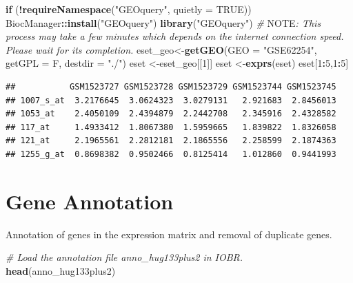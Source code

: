 \documentclass[
  12pt,
]{book}
\newenvironment{Shaded}{\begin{snugshade}}{\end{snugshade}}
\newcommand{\AlertTok}[1]{\textcolor[rgb]{0.94,0.16,0.16}{#1}}
\newcommand{\AttributeTok}[1]{\textcolor[rgb]{0.13,0.29,0.53}{#1}}
\newcommand{\CommentTok}[1]{\textcolor[rgb]{0.56,0.35,0.01}{\textit{#1}}}
\newcommand{\ConstantTok}[1]{\textcolor[rgb]{0.56,0.35,0.01}{#1}}
\newcommand{\ControlFlowTok}[1]{\textcolor[rgb]{0.13,0.29,0.53}{\textbf{#1}}}
\newcommand{\DecValTok}[1]{\textcolor[rgb]{0.00,0.00,0.81}{#1}}
\newcommand{\FunctionTok}[1]{\textcolor[rgb]{0.13,0.29,0.53}{\textbf{#1}}}
\newcommand{\NormalTok}[1]{#1}
\newcommand{\OtherTok}[1]{\textcolor[rgb]{0.56,0.35,0.01}{#1}}
\newcommand{\SpecialCharTok}[1]{\textcolor[rgb]{0.81,0.36,0.00}{\textbf{#1}}}
\newcommand{\StringTok}[1]{\textcolor[rgb]{0.31,0.60,0.02}{#1}}
\begin{document}
\begin{Shaded}
\begin{Highlighting}[]
\ControlFlowTok{if}\NormalTok{ (}\SpecialCharTok{!}\FunctionTok{requireNamespace}\NormalTok{(}\StringTok{"GEOquery"}\NormalTok{, }\AttributeTok{quietly =} \ConstantTok{TRUE}\NormalTok{))  BiocManager}\SpecialCharTok{::}\FunctionTok{install}\NormalTok{(}\StringTok{"GEOquery"}\NormalTok{)}
\FunctionTok{library}\NormalTok{(}\StringTok{"GEOquery"}\NormalTok{)}
\CommentTok{\# }\AlertTok{NOTE}\CommentTok{: This process may take a few minutes which depends on the internet connection speed. Please wait for its completion.}
\NormalTok{eset\_geo}\OtherTok{\textless{}{-}}\FunctionTok{getGEO}\NormalTok{(}\AttributeTok{GEO     =} \StringTok{"GSE62254"}\NormalTok{, }\AttributeTok{getGPL  =}\NormalTok{ F, }\AttributeTok{destdir =} \StringTok{"./"}\NormalTok{)}
\NormalTok{eset    }\OtherTok{\textless{}{-}}\NormalTok{eset\_geo[[}\DecValTok{1}\NormalTok{]]}
\NormalTok{eset    }\OtherTok{\textless{}{-}}\FunctionTok{exprs}\NormalTok{(eset)}
\NormalTok{eset[}\DecValTok{1}\SpecialCharTok{:}\DecValTok{5}\NormalTok{,}\DecValTok{1}\SpecialCharTok{:}\DecValTok{5}\NormalTok{]}
\end{Highlighting}
\end{Shaded}

\begin{verbatim}
##           GSM1523727 GSM1523728 GSM1523729 GSM1523744 GSM1523745
## 1007_s_at  3.2176645  3.0624323  3.0279131   2.921683  2.8456013
## 1053_at    2.4050109  2.4394879  2.2442708   2.345916  2.4328582
## 117_at     1.4933412  1.8067380  1.5959665   1.839822  1.8326058
## 121_at     2.1965561  2.2812181  2.1865556   2.258599  2.1874363
## 1255_g_at  0.8698382  0.9502466  0.8125414   1.012860  0.9441993
\end{verbatim}

\hypertarget{gene-annotation}{%
\section{Gene Annotation}\label{gene-annotation}}

Annotation of genes in the expression matrix and removal of duplicate genes.

\begin{Shaded}
\begin{Highlighting}[]
\CommentTok{\# Load the annotation file \textasciigrave{}anno\_hug133plus2\textasciigrave{} in IOBR.}
\FunctionTok{head}\NormalTok{(anno\_hug133plus2)}
\end{Highlighting}
\end{Shaded}
\end{document}
